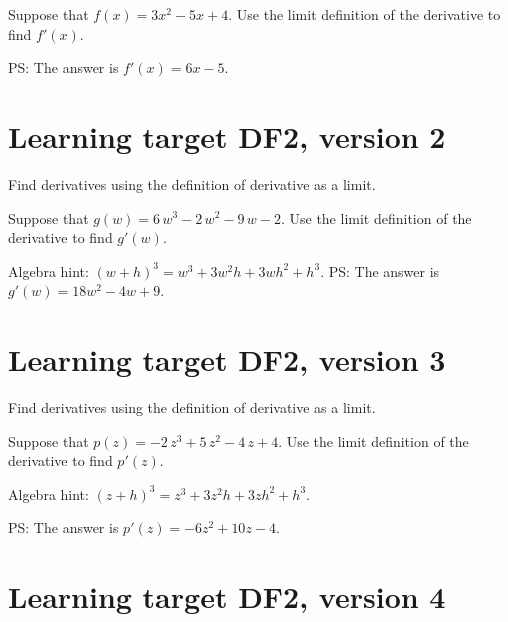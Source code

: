 Suppose that $f(x) = 3x^2 - 5x + 4$. Use the limit definition of the derivative to find $f'(x)$. 

\vfill

PS: The answer is $f'(x) = 6x - 5$.
\pagebreak

\section{Learning target DF2, version 2}

Find derivatives using the definition of derivative as a limit.

\hrulefill

Suppose that  \(g(w) = 6 \, w^{3} - 2 \, w^{2} - 9 \, w - 2\). Use the limit definition of the derivative to find $g'(w)$.

\vspace{1em} 

Algebra hint: $(w+h)^3 = w^3 + 3w^2 h + 3w h^2 + h^3$.
\vfill
PS: The answer is $g'(w) = 18w^2 - 4w + 9.$


\pagebreak

\section{Learning target DF2, version 3}

Find derivatives using the definition of derivative as a limit.

\hrulefill

Suppose that  \(p(z) = -2 \, z^{3} +5 \, z^{2} - 4 \, z +4\). Use the limit definition of the derivative to find $p'(z)$.

\vspace{1em} 

Algebra hint: $(z+h)^3 = z^3 + 3z^2 h + 3z h^2 + h^3$.

\vfill

PS: The answer is $p'(z) = -6z^2 + 10z - 4.$

\pagebreak

\section{Learning target DF2, version 4}

